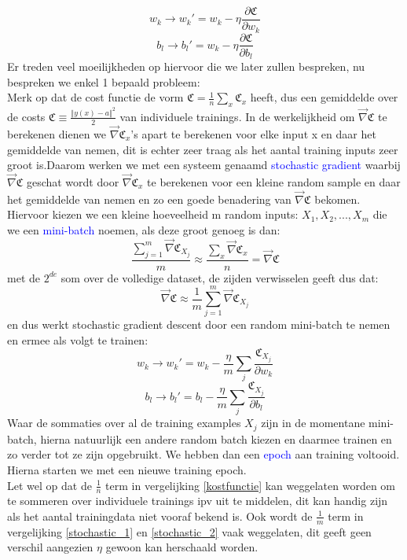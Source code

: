 \documentclass[10pt,a4paper,twoside]{article}
\begin{document}
\begin{equation*}
w_k \rightarrow w_k ' = w_k - \eta \frac{\partial \mathfrak{C}}{\partial w_k}
\end{equation*}
\begin{equation*}
b_l \rightarrow b_l ' = w_k - \eta \frac{\partial \mathfrak{C}}{\partial b_l}
\end{equation*}
Er treden veel moeilijkheden op hiervoor die we later zullen bespreken, nu bespreken we enkel 1 bepaald probleem:\\
Merk op dat de cost functie de vorm $\mathfrak{C} = \frac{1}{n}\sum_{x}\mathfrak{C}_x$ heeft, dus een gemiddelde over de costs $\mathfrak{C} \equiv \frac{\Vert y(x) -a \Vert ^2}{2}$ van individuele trainings. In de werkelijkheid om $\vec{\nabla}\mathfrak{C}$ te berekenen dienen we $\vec{\nabla}\mathfrak{C}_x$'s apart te berekenen voor elke input x en daar het gemiddelde van nemen, dit is echter zeer traag als het aantal training inputs zeer groot is.Daarom werken we met een systeem genaamd \textcolor{blue}{stochastic gradient} waarbij $\vec{\nabla}\mathfrak{C}$ geschat wordt door $\vec{\nabla}\mathfrak{C}_x$ te berekenen voor een kleine random sample en daar het gemiddelde van nemen en zo een goede benadering van $\vec{\nabla}\mathfrak{C}$ bekomen. Hiervoor kiezen we een kleine hoeveelheid m random inputs: $X_1,X_2,...,X_m$ die we een \textcolor{blue}{mini-batch} noemen, als deze groot genoeg is dan:
\begin{equation*}
	\frac{\sum_{j=1}^{m}\vec{\nabla} \mathfrak{C}_{X_j}}{m} \approx \frac{\sum_{x}^{}\vec{\nabla} \mathfrak{C}_{x}}{n} = \vec{\nabla} \mathfrak{C}
\end{equation*}
met de $2^{de}$ som over de volledige dataset, de zijden verwisselen geeft dus dat:
\begin{equation*}
	\vec{\nabla} \mathfrak{C} \approx \frac{1}{m}\sum_{j=1}^{m}\vec{\nabla} \mathfrak{C}_{X_j}
\end{equation*}
en dus werkt stochastic gradient descent door een random mini-batch te nemen en ermee als volgt te trainen:
\begin{equation}
w_k \rightarrow w_k ' = w_k - \frac{\eta}{m} \sum_{j}^{}\frac{\mathfrak{C}_{X_j}}{\partial w_k}
\label{stochastic_1}
\end{equation}
\begin{equation}
b_l \rightarrow b_l ' = b_l - \frac{\eta}{m} \sum_{j}^{}\frac{\mathfrak{C}_{X_j}}{\partial b_l}
\label{stochastic_2}
\end{equation}
Waar de sommaties over al de training examples $X_j$ zijn in de momentane mini-batch, hierna natuurlijk een andere random batch kiezen en daarmee trainen en zo verder tot ze zijn opgebruikt. We hebben dan een \textcolor{blue}{epoch} aan training voltooid. Hierna starten we met een nieuwe training epoch.\\
Let wel op dat de $\frac{1}{n}$ term in vergelijking \ref{kostfunctie} kan weggelaten worden om te sommeren over individuele trainings ipv uit te middelen, dit kan handig zijn als het aantal trainingdata niet vooraf bekend is. Ook wordt de $\frac{1}{m}$ term in vergelijking \ref{stochastic_1} en \ref{stochastic_2} vaak weggelaten, dit geeft geen verschil aangezien $\eta$ gewoon kan herschaald worden.\\
\end{document}
